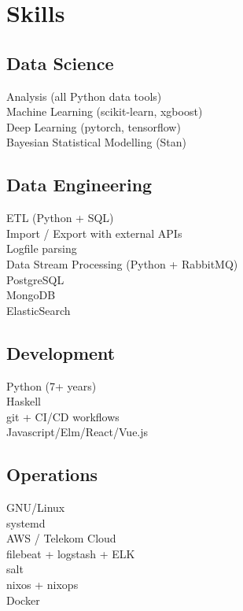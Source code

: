 \documentclass[]{deedy-resume-openfont}
\begin{document}
\begin{minipage}[t]{0.33\textwidth}



\sectionsep
\section{Skills}

\sectionsep
\subsection{Data Science}
\textbullet{} Analysis (all Python data tools) \\
\textbullet{} Machine Learning (scikit-learn, xgboost) \\
\textbullet{} Deep Learning (pytorch, tensorflow) \\
\textbullet{} Bayesian Statistical Modelling (Stan)\\

\sectionsep
\subsection{Data Engineering}
    \textbullet{} ETL (Python + SQL) \\
    \textbullet{} Import / Export with external APIs \\
    \textbullet{} Logfile parsing \\
    \textbullet{} Data Stream Processing (Python + RabbitMQ) \\
    \textbullet{} PostgreSQL \\
    \textbullet{} MongoDB \\
    \textbullet{} ElasticSearch \\

\sectionsep
\subsection{Development}
    \textbullet{} Python (7+ years)  \\
    \textbullet{} Haskell \\
    \textbullet{} git + CI/CD workflows \\
    \textbullet{} Javascript/Elm/React/Vue.js \\

\sectionsep
\subsection{Operations}
    \textbullet{} GNU/Linux \\
    \textbullet{} systemd \\
    \textbullet{} AWS / Telekom Cloud \\
    \textbullet{} filebeat + logstash + ELK \\
    \textbullet{} salt \\
    \textbullet{} nixos + nixops \\
    \textbullet{} Docker \\
   

\end{minipage}
\end{document}
